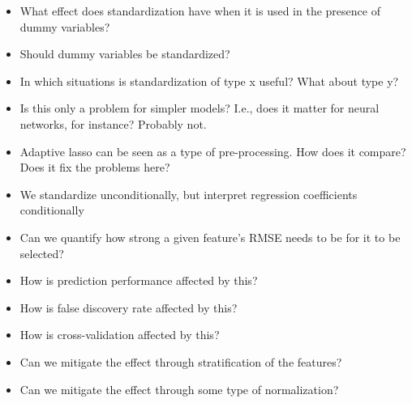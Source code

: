 \begin{itemize}
  \item What effect does standardization have when it is used in the presence of dummy variables?
  \item Should dummy variables be standardized?
  \item In which situations is standardization of type x useful? What about type y?
  \item Is this only a problem for simpler models? I.e., does it matter for neural networks, for instance? Probably not.
  \item Adaptive lasso can be seen as a type of pre-processing. How does it compare? Does it fix the problems here?
  \item We standardize unconditionally, but interpret regression coefficients conditionally
  \item Can we quantify how strong a given feature's RMSE needs to be for it to be selected?
  \item How is prediction performance affected by this?
  \item How is false discovery rate affected by this?
  \item How is cross-validation affected by this?
  \item Can we mitigate the effect through stratification of the features?
  \item Can we mitigate the effect through some type of normalization?
\end{itemize}

\printbibliography


